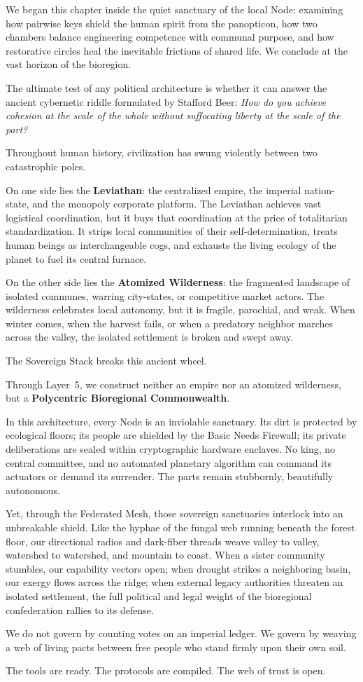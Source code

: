 We began this chapter inside the quiet sanctuary of the local Node: examining how pairwise keys shield the human spirit from the panopticon, how two chambers balance engineering competence with communal purpose, and how restorative circles heal the inevitable frictions of shared life. We conclude at the vast horizon of the bioregion.

The ultimate test of any political architecture is whether it can answer the ancient cybernetic riddle formulated by Stafford Beer: \textit{How do you achieve cohesion at the scale of the whole without suffocating liberty at the scale of the part?}

Throughout human history, civilization has swung violently between two catastrophic poles.

On one side lies the \textbf{Leviathan}: the centralized empire, the imperial nation-state, and the monopoly corporate platform. The Leviathan achieves vast logistical coordination, but it buys that coordination at the price of totalitarian standardization. It strips local communities of their self-determination, treats human beings as interchangeable cogs, and exhausts the living ecology of the planet to fuel its central furnace.

On the other side lies the \textbf{Atomized Wilderness}: the fragmented landscape of isolated communes, warring city-states, or competitive market actors. The wilderness celebrates local autonomy, but it is fragile, parochial, and weak. When winter comes, when the harvest fails, or when a predatory neighbor marches across the valley, the isolated settlement is broken and swept away.

The Sovereign Stack breaks this ancient wheel.

Through Layer~5, we construct neither an empire nor an atomized wilderness, but a \textbf{Polycentric Bioregional Commonwealth}.

In this architecture, every Node is an inviolable sanctuary. Its dirt is protected by ecological floors; its people are shielded by the Basic Needs Firewall; its private deliberations are sealed within cryptographic hardware enclaves. No king, no central committee, and no automated planetary algorithm can command its actuators or demand its surrender. The parts remain stubbornly, beautifully autonomous.

Yet, through the Federated Mesh, those sovereign sanctuaries interlock into an unbreakable shield. Like the hyphae of the fungal web running beneath the forest floor, our directional radios and dark-fiber threads weave valley to valley, watershed to watershed, and mountain to coast. When a sister community stumbles, our capability vectors open; when drought strikes a neighboring basin, our exergy flows across the ridge; when external legacy authorities threaten an isolated settlement, the full political and legal weight of the bioregional confederation rallies to its defense.

We do not govern by counting votes on an imperial ledger. We govern by weaving a web of living pacts between free people who stand firmly upon their own soil.

The tools are ready. The protocols are compiled. The web of trust is open.
